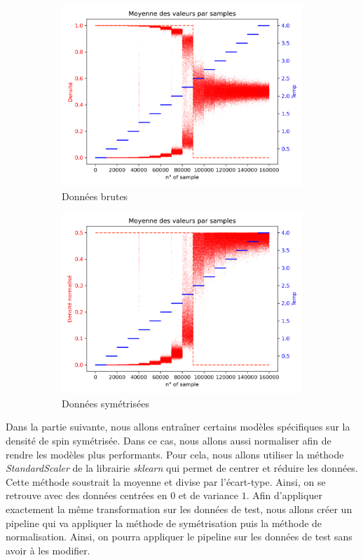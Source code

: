 \documentclass[11pt]{scrartcl} %
\begin{document}
\begin{figure}[h]
	\begin{subfigure}{0.5\textwidth}
		\includegraphics[width=0.95\linewidth]{./figures/raw_data.png}
		\caption{Données brutes}
		\label{fig:rawdata}
	\end{subfigure}
	\begin{subfigure}{0.5\textwidth}
		\includegraphics[width=0.95\linewidth]{./figures/sym_data.png}
		\caption{Données symétrisées}
		\label{fig:symdata}
	\end{subfigure}
	\caption{}
\end{figure}

Dans la partie suivante, nous allons entraîner certains modèles spécifiques sur la densité de spin symétrisée. Dans ce cas, nous allons aussi normaliser afin de rendre les modèles plus performants.
Pour cela, nous allons utiliser la méthode \textit{StandardScaler} de la librairie \textit{sklearn} qui permet de centrer et réduire les données. Cette méthode soustrait la moyenne et divise par l'écart-type. Ainsi, on se retrouve avec des données centrées en $0$ et de variance $1$.
Afin d'appliquer exactement la même transformation sur les données de test, nous allons créer un pipeline qui va appliquer la méthode de symétrisation puis la méthode de normalisation. Ainsi, on pourra appliquer le pipeline sur les données de test sans avoir à les modifier.
\end{document}
